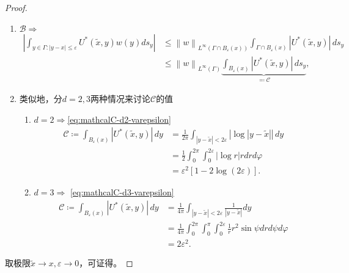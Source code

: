 \begin{proof}
\begin{enumerate}
  \item $\mathcal{B} \Rightarrow$
  \begin{equation*}
  \begin{split}
    \left|
    \int_{y \in \Gamma: \left| y - x \right| \le \varepsilon}
    U^{*}(\widetilde{x}, y) w(y) d s_y
    \right| & \le
    \left\| w \right\|_{L^{\infty} (\Gamma \cap B_{\varepsilon}(x))}
    \int_{\Gamma \cap B_{\varepsilon}(x)} \left| U^{*}(\widetilde{x}, y) \right| \, d s_y \\
    & \le \left\| w \right\|_{L^{\infty}(\Gamma)}
    \underbrace{
    \int_{B_{\varepsilon}(x)} \left| U^{*}(\widetilde{x}, y) \right| \, d s_y
    }_{\eqqcolon \mathcal{C}},
  \end{split}
  \end{equation*}
  \item 类似地，分$d=2,3$两种情况来讨论$\mathcal{C}$的值
  \begin{enumerate}
  \item $d=2 \Rightarrow $\eqref{eq:mathcalC-d2-varepsilon}
  \begin{equation*}
    \begin{split}
      \mathcal{C} \coloneqq \int_{B_{\varepsilon}(x)} \left| U^{*}(\widetilde{x}, y) \right| \, dy & =
      \frac{1}{2 \pi} \int_{\left| y - \widetilde{x} \right| < 2 \varepsilon}
      \left| \log \left| y - \widetilde{x} \right| \right| \, dy\\
      & = \frac{1}{2}
      \int_{0}^{2 \pi}
      \int_{0}^{2 \varepsilon}
      \left|
      \log r
      \right|
      r
      dr d \varphi \\
      & = \varepsilon^2 \left[ 1 - 2 \log \left(2 \varepsilon \right) \right].
    \end{split}
  \end{equation*}
  \item $d = 3 \Rightarrow$    \eqref{eq:mathcalC-d3-varepsilon}
  \begin{equation*}
    \begin{split}
      \mathcal{C} \coloneqq \int_{B_{\varepsilon}(x)} \left| U^{*}(\widetilde{x}, y) \right| \, dy & = \frac{1}{4 \pi}
      \int_{\left| y - \widetilde{x} \right| < 2 \varepsilon}
      \frac{1}{\left| y - \widetilde{x} \right|} dy \\
      & = \frac{1}{4 \pi}
      \int_{0}^{2 \pi}
      \int_{0}^{\pi}
      \int_{0}^{2 \varepsilon}
      \frac{1}{r}
      r^2
      \sin \psi
      dr d \psi d \varphi \\
      & = 2 \varepsilon^2.
    \end{split}
  \end{equation*}
  \end{enumerate}
  \end{enumerate}

  取极限$\widetilde{x} \rightarrow x, \varepsilon \rightarrow 0$，可证得。
\end{proof}

